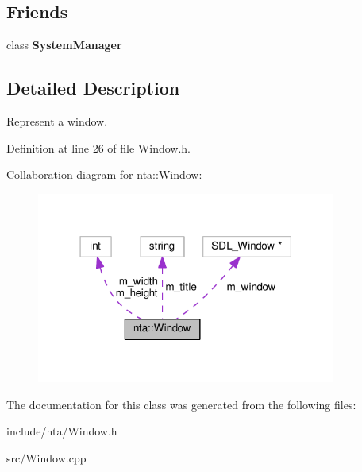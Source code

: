 \subsection*{Friends}
\begin{DoxyCompactItemize}
\item 
\mbox{\label{classnta_1_1Window_ab1ef2aa9992dd8ae85793e1a1f980e1e}} 
class {\bfseries System\+Manager}
\end{DoxyCompactItemize}


\subsection{Detailed Description}
Represent a window. 

Definition at line 26 of file Window.\+h.



Collaboration diagram for nta\+:\+:Window\+:\nopagebreak
\begin{figure}[H]
\begin{center}
\leavevmode
\includegraphics[width=279pt]{da/daa/classnta_1_1Window__coll__graph}
\end{center}
\end{figure}


The documentation for this class was generated from the following files\+:\begin{DoxyCompactItemize}
\item 
include/nta/Window.\+h\item 
src/Window.\+cpp\end{DoxyCompactItemize}
